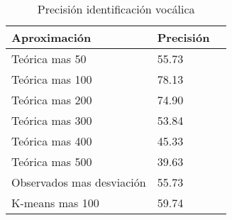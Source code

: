 \begin{table}[H]
\centering
\caption{Precisión identificación vocálica}
\label{tab:resultados_vocales}
\begin{tabular}{|l|l|l|}
Aproximación & Precisión \\ \hline
Teórica mas 50 & 55.73 \\ \hline
Teórica mas 100 & 78.13 \\ \hline
Teórica mas 200 & 74.90 \\ \hline
Teórica mas 300 & 53.84 \\ \hline
Teórica mas 400 & 45.33 \\ \hline
Teórica mas 500 & 39.63 \\ \hline
Observados mas desviación & 55.73 \\ \hline
K-means mas 100 & 59.74 \\ \hline
\end{tabular}

\end{table}